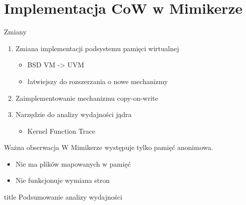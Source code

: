 \documentclass[notes]{beamer}
\newcommand\Header[1]{%
  \begin{frame}
  \vfill
  \centering
  \begin{beamercolorbox}[sep=8pt,center]{title}
    \usebeamerfont{title}#1\par%
  \end{beamercolorbox}
  \vfill
  \end{frame}
}
\begin{document}
\section{Implementacja CoW w Mimikerze}

\begin{frame}{Zmiany}
  \linespread{1.5}
  \begin{enumerate}
    \item<1-> Zmiana implementacji podsystemu pamięci wirtualnej
      \begin{itemize}
        \item BSD VM -> UVM
        \item łatwiejszy do rozszerzania o nowe mechanizmy
      \end{itemize}
    \vfill
    \item<2-> Zaimplementowanie mechanizmu copy-on-write
    \vfill
    \item<3-> Narzędzie do analizy wydajności jądra
      \begin{itemize}
        \item Kernel Function Trace
      \end{itemize}
  \end{enumerate}
\end{frame}

\begin{frame}{Ważna  obserwacja}
  \centering
  \vspace{1cm}
  {\huge W Mimikerze występuje tylko pamięć anonimowa.}

  \vspace{2cm}

  \begin{itemize}
    \item Nie ma plików mapowanych w pamięć
    \item Nie funkcjonuje wymiana stron
  \end{itemize}

\end{frame}

\Header{Podsumowanie analizy wydajności}
\end{document}
